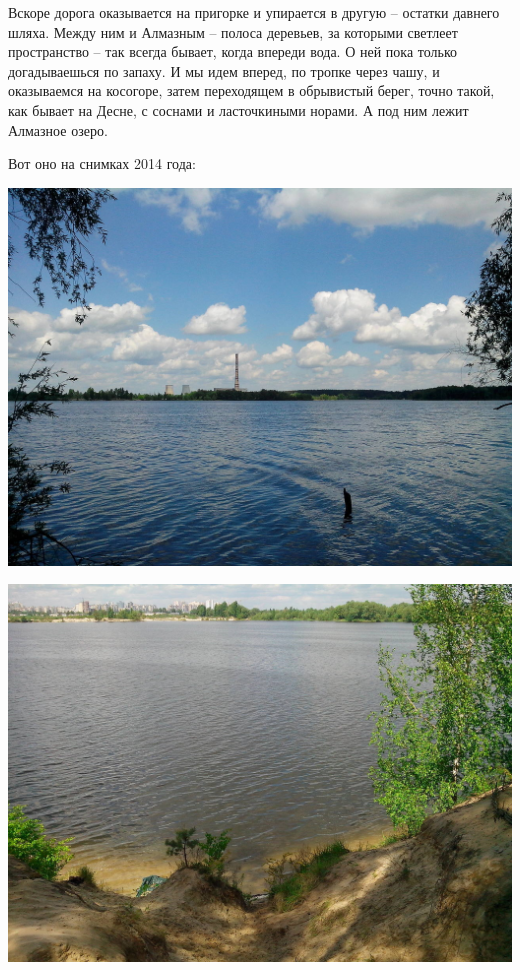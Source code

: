 Вскоре дорога оказывается на пригорке и упирается в другую – остатки давнего шляха. Между ним и Алмазным – полоса деревьев, за которыми светлеет пространство – так всегда бывает, когда впереди вода. О ней пока только догадываешься по запаху. И мы идем вперед, по тропке через чашу, и оказываемся на косогоре, затем переходящем в обрывистый берег, точно такой, как бывает на Десне, с соснами и ласточкиными норами. А под ним лежит Алмазное озеро.

Вот оно на снимках 2014 года:
\vspace*{\fill}
\begin{center}
\includegraphics[width=\linewidth]{chast-gorodki/kolpit/s_IMG_20140513_124640.jpg}
\end{center}
\vspace*{\fill}
\newpage

\begin{center}
\includegraphics[width=\linewidth]{chast-gorodki/kolpit/s_IMG_20140513_123046.jpg}
\end{center}

